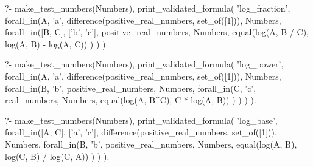 \begin{fact}
\begin{prolog}
?-	make_test_numbers(Numbers),
	print_validated_formula(
		'log_fraction',
		forall_in(A, 'a', difference(positive_real_numbers, set_of([1])), Numbers,
			forall_in([B, C], ['b', 'c'], positive_real_numbers, Numbers,
				equal(log(A, B / C), log(A, B) - log(A, C))
			)
		)
	).				
\end{prolog}
\begin{prolog}
?-	make_test_numbers(Numbers),
	print_validated_formula(
		'log_power',
		forall_in(A, 'a', difference(positive_real_numbers, set_of([1])), Numbers,
			forall_in(B, 'b', positive_real_numbers, Numbers, 
				forall_in(C, 'c', real_numbers, Numbers,
					equal(log(A, B^C), C * log(A, B))
				)
			)
		)
	).
\end{prolog}
\begin{prolog}
?-	make_test_numbers(Numbers),
	print_validated_formula(
		'log_base',
		forall_in([A, C], ['a', 'c'], difference(positive_real_numbers, set_of([1])), Numbers,
			forall_in(B, 'b', positive_real_numbers, Numbers,
				equal(log(A, B), log(C, B) / log(C, A))
			)
		)
	).				
\end{prolog}
\end{fact}
